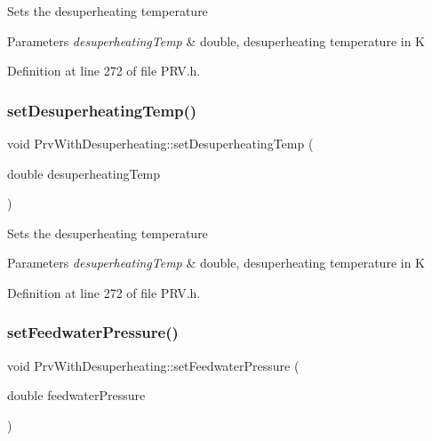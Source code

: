 Sets the desuperheating temperature


\begin{DoxyParams}{Parameters}
{\em desuperheating\+Temp} & double, desuperheating temperature in K \\
\hline
\end{DoxyParams}


Definition at line 272 of file P\+R\+V.\+h.

\mbox{\label{class_prv_with_desuperheating_ade1b153c495efb451006b3c054ff386e}} 
\subsubsection{\texorpdfstring{set\+Desuperheating\+Temp()}{setDesuperheatingTemp()}\hspace{0.1cm}{\footnotesize\ttfamily [3/3]}}
{\footnotesize\ttfamily void Prv\+With\+Desuperheating\+::set\+Desuperheating\+Temp (\begin{DoxyParamCaption}\item[{double}]{desuperheating\+Temp }\end{DoxyParamCaption})\hspace{0.3cm}{\ttfamily [inline]}}

Sets the desuperheating temperature


\begin{DoxyParams}{Parameters}
{\em desuperheating\+Temp} & double, desuperheating temperature in K \\
\hline
\end{DoxyParams}


Definition at line 272 of file P\+R\+V.\+h.

\mbox{\label{class_prv_with_desuperheating_a8494ebf87e5bd834f621b0c7ca257fbe}} 
\subsubsection{\texorpdfstring{set\+Feedwater\+Pressure()}{setFeedwaterPressure()}\hspace{0.1cm}{\footnotesize\ttfamily [1/3]}}
{\footnotesize\ttfamily void Prv\+With\+Desuperheating\+::set\+Feedwater\+Pressure (\begin{DoxyParamCaption}\item[{double}]{feedwater\+Pressure }\end{DoxyParamCaption})\hspace{0.3cm}{\ttfamily [inline]}}

